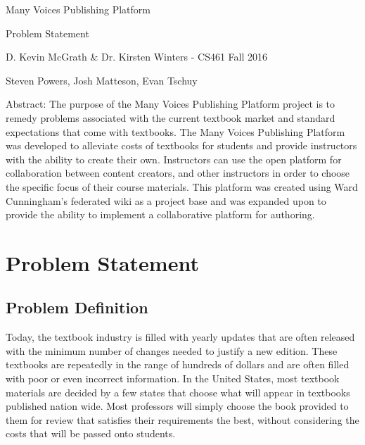 \documentclass[letterpaper, 10pt, draftclsnofoot, onecolumn]{IEEEtran}
\begin{document}
\begin{titlepage}
\centering
{\huge Many Voices Publishing Platform\par}
{\LARGE Problem Statement\par}
{\vspace{2mm}}
{\large D. Kevin McGrath \& Dr. Kirsten Winters -  CS461 Fall 2016\par}
{\large Steven Powers, Josh Matteson, Evan Tschuy\par}
{\vspace{10mm}}
{\large Abstract:  The purpose of the Many Voices Publishing Platform 
project is to remedy problems associated with the current textbook market 
and standard expectations that come with textbooks. 
The Many Voices Publishing Platform was developed to alleviate 
costs of textbooks for students and provide instructors with the ability 
to create their own. Instructors can use the open platform for 
collaboration between content creators, and other instructors in order 
to choose the specific focus of their course materials. 
This platform was created using Ward Cunningham's federated 
wiki as a project base and was expanded upon to provide 
the ability to implement a collaborative platform for authoring.\par}
\end{titlepage}

\vspace{1pc}
\section{Problem Statement}
\vspace{2pc}

\vspace{1pc}
\subsection{Problem Definition}
\vspace{1pc}

{\noindent Today, the textbook industry is filled with yearly updates that 
are often released with the minimum number of changes needed to 
justify a new edition. These textbooks are repeatedly in the range of 
hundreds of dollars and are often filled with poor or even incorrect 
information. 
In the United States, most textbook materials are decided by a few 
states that choose what will appear in textbooks published nation wide. 
Most professors will simply choose the book provided to them for 
review that satisfies their requirements the best, without considering 
the costs that will be passed onto students. \par}
\end{document}
